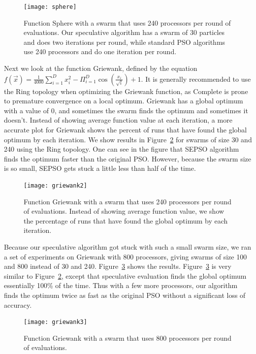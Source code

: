 \documentclass[journal,letterpaper]{IEEEtran}
\newcommand{\fig}[1]{Figure~\ref{fig:#1}}
\begin{document}
\begin{figure}
  \centering
  \texttt{[image: sphere]}
  \caption{Function Sphere with a swarm that uses 240 processors per round of
  evaluations.  Our speculative algorithm has a swarm of 30 particles and does
  two iterations per round, while standard PSO algorithms use 240 processors
  and do one iteration per round.}
  \label{fig:basic-sphere}
\end{figure}

Next we look at the function Griewank, defined by the equation $f(\Vec{x}) =
\frac{1}{4000} \sum_{i=1}^D x_i^2 - \Pi_{i=1}^D \cos\left(\frac{x_i}{\sqrt{i}}
\right) + 1$.  It is generally recommended to use the Ring topology when
optimizing the Griewank function, as Complete is prone to premature convergence
on a local optimum.  Griewank has a global optimum with a value of 0, and
sometimes the swarm finds the optimum and sometimes it doesn't.  Instead of
showing average function value at each iteration, a more accurate plot for
Griewank shows the percent of runs that have found the global optimum by each
iteration.  We show results in \fig{basic-griewank2} for swarms of size 30 and
240 using the Ring topology.  One can see in the figure that SEPSO algorithm
finds the optimum faster than the original PSO.  However, because the swarm
size is so small, SEPSO gets stuck a little less than half of the time.

\begin{figure}
  \centering
  \texttt{[image: griewank2]}
  \caption{Function Griewank with a swarm that uses 240 processors per round of
  evaluations.  Instead of showing average function value, we show the
  percentage of runs that have found the global optimum by each iteration.}
  \label{fig:basic-griewank2}
\end{figure}

Because our speculative algorithm got stuck with such a small swarm size, we
ran a set of experiments on Griewank with 800 processors, giving swarms of size
100 and 800 instead of 30 and 240.  \fig{basic-griewank3} shows the results.
\fig{basic-griewank3} is very similar to \fig{basic-griewank2}, except that
speculative evaluation finds the global optimum essentially 100\% of the time.
Thus with a few more processors, our algorithm finds the optimum twice as fast
as the original PSO without a significant loss of accuracy.

\begin{figure}
  \centering
  \texttt{[image: griewank3]}
  \caption{Function Griewank with a swarm that uses 800 processors per round of
  evaluations.}
  \label{fig:basic-griewank3}
\end{figure}
\end{document}
